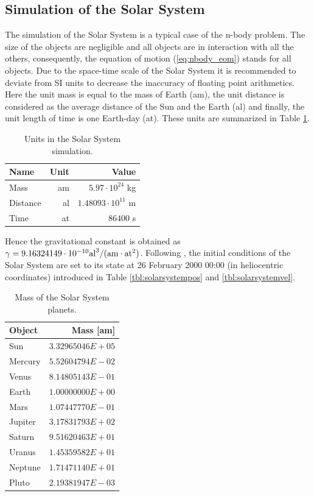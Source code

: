 \documentclass[a4paper,12pt,openany]{book}
\newcommand{\equref}[1]{(\ref{#1})}
\theoremstyle{break}
\begin{document}
\subsection{Simulation of the Solar System}
The simulation of the Solar System is a typical case of the n-body problem. The size of the objects are negligible and all objects are in interaction with all the others, consequently, the equation of motion \equref{eq:nbody_eom} stands for all objects.
Due to the space-time scale of the Solar System it is recommended to deviate from SI units to decrease the inaccuracy of floating point arithmetics. Here the unit mass is equal to the mass of Earth (am), the unit distance is considered as the average distance of the Sun and the Earth (al) and finally, the unit length of time is one Earth-day (at). These units are summarized in Table \ref{tbl:astronomical_units}.
\begin{table} [H]
\begin{center}
\caption{Units in the Solar System simulation.}\label{tbl:astronomical_units}
\begin{tabular}{ l r r }
\toprule[1.5pt]
\bf Name & \bf Unit & \bf Value \\
\midrule
Mass & am & $5.97\cdot 10^{24}$ kg \\
Distance & al & $1.48093\cdot 10^{11}$ m \\
Time & at & $86400$ s \\
\bottomrule[1.25pt]
\end{tabular}
\end{center}
\end{table}
Hence the gravitational constant is obtained as $\gamma=9.16324149\cdot 10^{-10}\rm{al}^3/(\rm{am}\cdot \rm{at}^2)$. Following \cite{Arminjon2002}, the initial conditions of the Solar System are set to its state at 26 February 2000 00:00 (in heliocentric coordinates) introduced in Table \ref{tbl:solarsystempos} and \ref{tbl:solarsystemvel}. 
\begin{table} [H]
\begin{center}
\caption{Mass of the Solar System planets.}\label{tbl:solarsystemmass}
\begin{tabular}{ l r }
\toprule[1.5pt]
\bf Object & \bf Mass [am] \\
\midrule
Sun & $3.32965046E+05$ \\
Mercury & $5.52604794E-02$ \\
Venus & $8.14805143E-01$ \\
Earth & $1.00000000E+00$ \\
Mars & $1.07447770E-01$ \\
Jupiter & $3.17831793E+02$ \\
Saturn & $9.51620463E+01$ \\
Uranus & $1.45359582E+01$ \\
Neptune & $1.71471140E+01$ \\
Pluto & $2.19381947E-03$ \\
\bottomrule[1.25pt]
\end{tabular}
\end{center}
\end{table}
\end{document}
